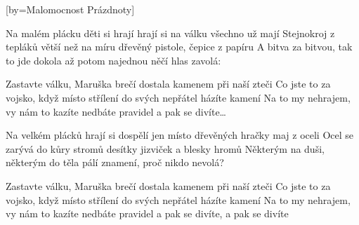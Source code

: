 [by={Malomocnost Prázdnoty}]

\beginverse{}
Na malém plácku děti si hrají
hrají si na válku všechno už mají
Stejnokroj z tepláků větší než na míru
dřevěný pistole, čepice z papíru
A bitva za bitvou, tak to jde dokola
až potom najednou něčí hlas zavolá:
\endverse{}

\beginchorus{}
Zastavte válku, Maruška brečí
dostala kamenem při naší zteči
Co jste to za vojsko, když místo střílení
do svých nepřátel házíte kamení
Na to my nehrajem, vy nám to kazíte
nedbáte pravidel a pak se divíte\ldots{}
\endchorus{}

\beginverse{}
Na velkém plácků hrají si dospělí
jen místo dřevěných hračky maj z oceli
Ocel se zarývá do kůry stromů
desítky jizviček a blesky hromů
Některým na duši, některým do těla
pálí znamení, proč nikdo nevolá?
\endverse{}

\beginchorus{}
Zastavte válku, Maruška brečí
dostala kamenem při naší zteči
Co jste to za vojsko, když místo střílení
do svých nepřátel házíte kamení
Na to my nehrajem, vy nám to kazíte
nedbáte pravidel a pak se divíte, a pak se divíte
\endchorus{}

\endsong{}
